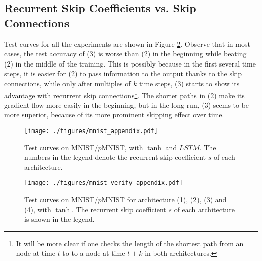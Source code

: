 \subsection{Recurrent Skip Coefficients vs. Skip Connections}
Test curves for all the experiments are shown in Figure \ref{fig:verify_ex}.
Observe that in most cases,
the test accuracy of (3) is worse than (2) in the beginning
while beating (2) in the middle of the training.
This is possibly because in the first several time steps, it is easier
for (2) to pass information to the output thanks to the skip connections,
while only after multiples of $k$ time steps, (3) starts to show its
advantage with recurrent skip connections\footnote{It will be more clear if one checks the length
of the shortest path from an node at time $t$ to to a node at time $t+k$ in both architectures.}.
The shorter paths in (2) make its gradient flow more easily in the beginning,
but in the long run, (3) seems to be more superior, because of its more prominent skipping effect over time. 

\begin{figure}[htp]
\center
\texttt{[image: ./figures/mnist\_appendix.pdf]}
\vspace{-10pt}
\caption{Test curves on MNIST/$p$MNIST, with $\tanh$ and $LSTM$. The numbers in the legend
denote the recurrent skip coefficient $s$ of each architecture.}
\label{fig:mnist_ex}
\end{figure}




\begin{figure}[htp]
\center
\texttt{[image: ./figures/mnist\_verify\_appendix.pdf]}
\vspace{-10pt}
\caption{Test curves on MNIST/$p$MNIST for architecture (1), (2), (3) and (4), with $\tanh$.
The recurrent skip coefficient $s$ of each architecture is shown in the legend.}
\label{fig:verify_ex}
\end{figure}




{\small 


}
\appendix



